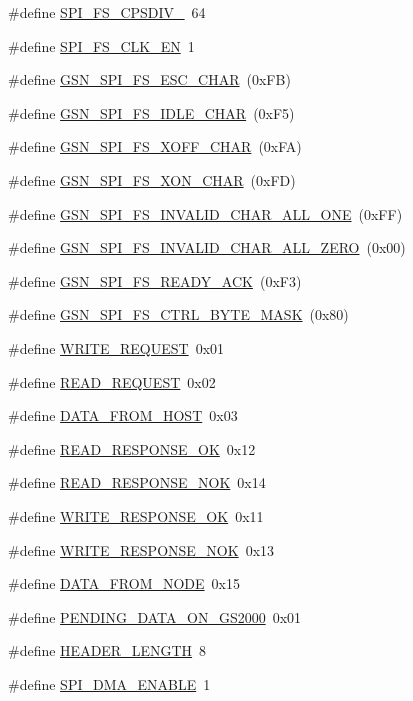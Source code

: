 \begin{DoxyCompactItemize}
\#define \hyperlink{a00589_a9c9080a0874c016fbec96a660044247f}{SPI\_\-FS\_\-CPSDIV\_}~64
\item 
\#define \hyperlink{a00589_a297ad584823afe3301f2f4be272fcfcf}{SPI\_\-FS\_\-CLK\_\-EN}~1
\item 
\#define \hyperlink{a00589_a7e094b6ce520816d1515bb857773d6d8}{GSN\_\-SPI\_\-FS\_\-ESC\_\-CHAR}~(0xFB)
\item 
\#define \hyperlink{a00589_acd339376b057e3f2e518c3985f6b4556}{GSN\_\-SPI\_\-FS\_\-IDLE\_\-CHAR}~(0xF5)
\item 
\#define \hyperlink{a00589_a12c2ba9d783631bc6075f1f8edb9e86e}{GSN\_\-SPI\_\-FS\_\-XOFF\_\-CHAR}~(0xFA)
\item 
\#define \hyperlink{a00589_af60bde658bec4d3ef49b90312527b19a}{GSN\_\-SPI\_\-FS\_\-XON\_\-CHAR}~(0xFD)
\item 
\#define \hyperlink{a00589_a6f299c98b20c562e7e5c9f96ec285cff}{GSN\_\-SPI\_\-FS\_\-INVALID\_\-CHAR\_\-ALL\_\-ONE}~(0xFF)
\item 
\#define \hyperlink{a00589_a9a050ad044f5bc765e6c7f9a61b8939a}{GSN\_\-SPI\_\-FS\_\-INVALID\_\-CHAR\_\-ALL\_\-ZERO}~(0x00)
\item 
\#define \hyperlink{a00589_a1e6c69b9e22982253a2f60606f5f822b}{GSN\_\-SPI\_\-FS\_\-READY\_\-ACK}~(0xF3)
\item 
\#define \hyperlink{a00589_a3204c4dc871b1ad1a9ef9824ffc6363a}{GSN\_\-SPI\_\-FS\_\-CTRL\_\-BYTE\_\-MASK}~(0x80)
\item 
\#define \hyperlink{a00589_a3fb6efb4be8a3eb5b2678df5a7033604}{WRITE\_\-REQUEST}~0x01
\item 
\#define \hyperlink{a00589_ab8b31ace42d6cdb829200d1b45e39ca0}{READ\_\-REQUEST}~0x02
\item 
\#define \hyperlink{a00589_af6a3ab9ad7679428b8a2f90378d257c1}{DATA\_\-FROM\_\-HOST}~0x03
\item 
\#define \hyperlink{a00589_abd5117f82f969dacb2121e9a48032d2d}{READ\_\-RESPONSE\_\-OK}~0x12
\item 
\#define \hyperlink{a00589_a9ae728298b7c0c38e03d1636850773d5}{READ\_\-RESPONSE\_\-NOK}~0x14
\item 
\#define \hyperlink{a00589_ae0509361e0d2df95bf9484396f90223d}{WRITE\_\-RESPONSE\_\-OK}~0x11
\item 
\#define \hyperlink{a00589_a176bedef2f7457783034199024e0bd7f}{WRITE\_\-RESPONSE\_\-NOK}~0x13
\item 
\#define \hyperlink{a00589_a86f2b9e66b5ab567ed3ed421c8f5ec85}{DATA\_\-FROM\_\-NODE}~0x15
\item 
\#define \hyperlink{a00589_a7c37cc67ba42cab17793abaf5eefe850}{PENDING\_\-DATA\_\-ON\_\-GS2000}~0x01
\item 
\#define \hyperlink{a00589_acaf400df9a74b3295697ca29cc9261cb}{HEADER\_\-LENGTH}~8
\item 
\#define \hyperlink{a00589_a82dc6617ad4a3ec4336c9739f8657e1c}{SPI\_\-DMA\_\-ENABLE}~1
\end{DoxyCompactItemize}
